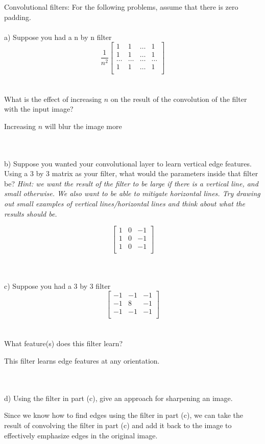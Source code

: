 \begin{Parts}
\Part
Convolutional filters: For the following problems, assume that there is zero padding.
\\\\ a) Suppose you had a n by n filter
        $$ \dfrac{1}{n^2}
        \begin{bmatrix}
        1 & 1 & \dots & 1 \\
        1 & 1 & \dots & 1 \\
        \dots & \dots & \dots & \dots \\
        1 & 1 & \dots & 1 \\
        \end{bmatrix}$$
\\\\ What is the effect of increasing $n$ on the result of the convolution of the filter with the input image?
\begin{solution}
Increasing $n$ will blur the image more
\end{solution}
\\\\ b) Suppose you wanted your convolutional layer to learn vertical edge features. Using a 3 by 3 matrix as your filter, what would the parameters inside that filter be? \textit{Hint: we want the result of the filter to be large if there is a vertical line, and small otherwise. We also want to be able to mitigate horizontal lines. Try drawing out small examples of vertical lines/horizontal lines and think about what the results should be.}
\begin{solution}
    $$
    \begin{bmatrix}
    1 & 0 & -1 \\
    1 & 0 & -1 \\
    1 & 0 & -1 \\
    \end{bmatrix}$$
\end{solution}
\\\\ c) Suppose you had a 3 by 3 filter
        $$
        \begin{bmatrix}
        -1 & -1 & -1 \\
        -1 & 8 & -1 \\
        -1 & -1 & -1 \\
        \end{bmatrix}$$
\\\\ What feature(s) does this filter learn?
\begin{solution}
This filter learns edge features at any orientation. 
\end{solution}
\\\\ d) Using the filter in part (c), give an approach for sharpening an image.
\begin{solution}
Since we know how to find edges using the filter in part (c), we can take the result of convolving the filter in part (c) and add it back to the image to effectively emphasize edges in the original image.
\end{solution}

\end{Parts}
